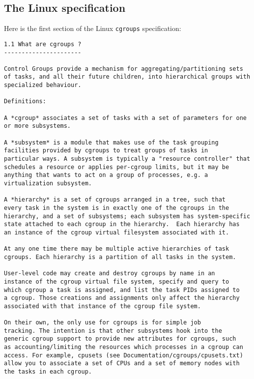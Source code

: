 \documentclass[a4paper,twoside,12pt]{article}
\begin{document}
\subsection{The Linux specification\cite{linuxgroups}}

Here is the first section of the Linux \texttt{cgroups} specification\cite{linuxgroups}:

{\scriptsize \begin{verbatim}
1.1 What are cgroups ?
----------------------

Control Groups provide a mechanism for aggregating/partitioning sets
of tasks, and all their future children, into hierarchical groups with
specialized behaviour.

Definitions:

A *cgroup* associates a set of tasks with a set of parameters for one
or more subsystems.

A *subsystem* is a module that makes use of the task grouping
facilities provided by cgroups to treat groups of tasks in
particular ways. A subsystem is typically a "resource controller" that
schedules a resource or applies per-cgroup limits, but it may be
anything that wants to act on a group of processes, e.g. a
virtualization subsystem.

A *hierarchy* is a set of cgroups arranged in a tree, such that
every task in the system is in exactly one of the cgroups in the
hierarchy, and a set of subsystems; each subsystem has system-specific
state attached to each cgroup in the hierarchy.  Each hierarchy has
an instance of the cgroup virtual filesystem associated with it.

At any one time there may be multiple active hierarchies of task
cgroups. Each hierarchy is a partition of all tasks in the system.

User-level code may create and destroy cgroups by name in an
instance of the cgroup virtual file system, specify and query to
which cgroup a task is assigned, and list the task PIDs assigned to
a cgroup. Those creations and assignments only affect the hierarchy
associated with that instance of the cgroup file system.

On their own, the only use for cgroups is for simple job
tracking. The intention is that other subsystems hook into the
generic cgroup support to provide new attributes for cgroups, such
as accounting/limiting the resources which processes in a cgroup can
access. For example, cpusets (see Documentation/cgroups/cpusets.txt)
allow you to associate a set of CPUs and a set of memory nodes with
the tasks in each cgroup.
\end{verbatim}}
\end{document}
